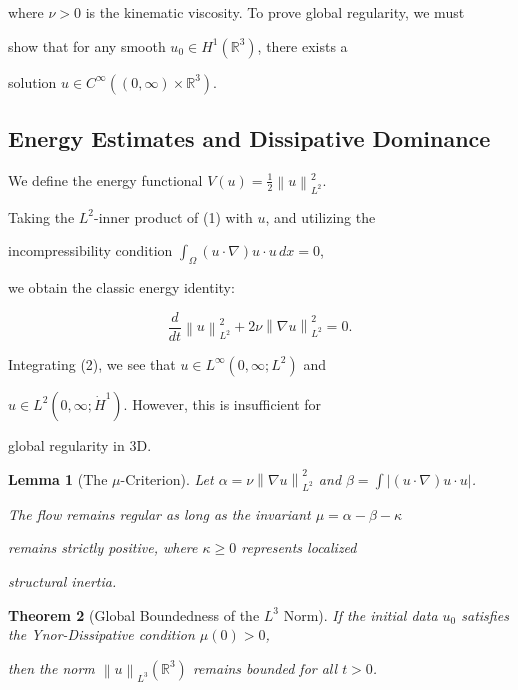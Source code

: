 \documentclass[11pt,a4paper]{amsart}
\newtheorem{theorem}{Theorem}[section]
\newtheorem{lemma}[theorem]{Lemma}
\newcommand{\alphacoeff}{\ensuremath{\alpha}}
\newcommand{\betacoeff}{\ensuremath{\beta}}
\newcommand{\kappacoeff}{\ensuremath{\kappa}}
\newcommand{\mumargin}{\ensuremath{\mu}}
\newcommand{\norm}[1]{\left\|#1\right\|}
\begin{document}
where $\nu > 0$ is the kinematic viscosity. To prove global regularity, we must 

show that for any smooth $u_0 \in H^1(\mathbb{R}^3)$, there exists a 

solution $u \in C^{\infty}((0, \infty) \times \mathbb{R}^3)$.



\subsection{Energy Estimates and Dissipative Dominance}

We define the energy functional $V(u) = \frac{1}{2} \norm{u}_{L^2}^2$. 

Taking the $L^2$-inner product of (1) with $u$, and utilizing the 

incompressibility condition $\int_{\Omega} (u \cdot \nabla) u \cdot u \, dx = 0$, 

we obtain the classic energy identity:

\begin{equation}

    \frac{d}{dt} \norm{u}_{L^2}^2 + 2\nu \norm{\nabla u}_{L^2}^2 = 0.

\end{equation}

Integrating (2), we see that $u \in L^{\infty}(0, \infty; L^2)$ and 

$u \in L^2(0, \infty; \dot{H}^1)$. However, this is insufficient for 

global regularity in 3D. 



\begin{lemma}[The $\mumargin$-Criterion]

Let $\alphacoeff = \nu \norm{\nabla u}_{L^2}^2$ and $\betacoeff = \int |(u \cdot \nabla)u \cdot u|$. 

The flow remains regular as long as the invariant $\mumargin = \alphacoeff - \betacoeff - \kappacoeff$ 

remains strictly positive, where $\kappacoeff \ge 0$ represents localized 

structural inertia.

\end{lemma}



\begin{theorem}[Global Boundedness of the $L^3$ Norm]

If the initial data $u_0$ satisfies the Ynor-Dissipative condition $\mumargin(0) > 0$, 

then the norm $\norm{u}_{L^3}(\mathbb{R}^3)$ remains bounded for all $t > 0$.

\end{theorem}
\end{document}
